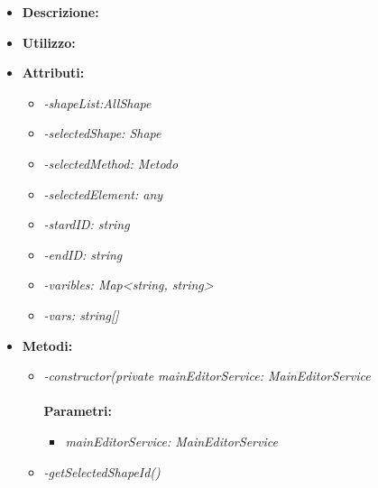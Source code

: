 \begin{itemize}
	\item \textbf{Descrizione:}\\
	
	\item \textbf{Utilizzo:}\\
	
	\item \textbf{Attributi:}
		\begin{itemize}
			\item \emph{-shapeList:AllShape}\\
			
			\item \emph{-selectedShape: Shape}\\
			
			\item \emph{-selectedMethod: Metodo}\\
			
			\item \emph{-selectedElement: any}\\
			
			\item \emph{-stardID: string}\\
			
			\item \emph{-endID: string}\\
			
			\item \emph{-varibles: Map<string, string>}\\
			
			\item \emph{-vars: string[]}\\
			
		\end{itemize}
	\item \textbf{Metodi:}
		\begin{itemize}
			\item \emph{-constructor(private mainEditorService: MainEditorService}\\
    		\\
    		\textbf{Parametri:}
    		\begin{itemize}
    			\item \emph{mainEditorService: MainEditorService}\\
    			
    		\end{itemize}
    		\item \emph{-getSelectedShapeId()}\\
    		

\end{itemize}
\end{itemize}
